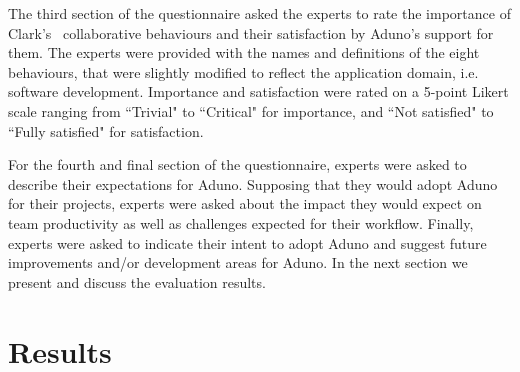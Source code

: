 \documentclass[conference]{IEEEtran}
\begin{document}
The third section of the questionnaire asked the experts to rate the importance of Clark's~\cite{Clark96} collaborative behaviours and their satisfaction by Aduno's support for them. The experts were provided with the names and definitions of the eight behaviours, that were slightly modified to reflect the application domain, i.e. software development. Importance and satisfaction were rated on a 5-point Likert scale ranging from ``Trivial" to ``Critical" for importance, and ``Not satisfied" to ``Fully satisfied" for satisfaction. 

For the fourth and final section of the questionnaire, experts were asked to describe their expectations for Aduno. Supposing that they would adopt Aduno for their projects, experts were asked about the impact they would expect on team productivity as well as challenges expected for their workflow. Finally, experts were asked to indicate their intent to adopt Aduno and suggest future improvements and/or development areas for Aduno. In the next section we present and discuss the evaluation results.

\section{Results}
\label{sec:results}
\end{document}

